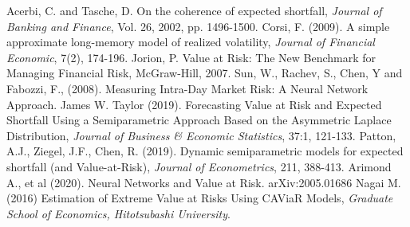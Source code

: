 \documentclass[a4paper,11pt,oneside]{book}
\begin{document}
	
	
	






	

	






Acerbi, C. and Tasche, D. On the coherence of expected shortfall, \textit{Journal of Banking and Finance}, Vol. 26, 2002,
pp. 1496-1500.\newline\newline
Corsi, F. (2009). A simple approximate long-memory model of realized volatility, \textit{Journal of
Financial Economic}, 7(2), 174-196.\newline\newline 
Jorion, P. Value at Risk: The New Benchmark for Managing Financial Risk, McGraw-Hill, 2007.\newline\newline
Sun, W., Rachev, S., Chen, Y and Fabozzi, F., (2008). Measuring Intra-Day Market
Risk: A Neural Network Approach.\newline\newline
James W. Taylor (2019). Forecasting Value at Risk and Expected Shortfall
Using a Semiparametric Approach Based on the Asymmetric Laplace Distribution, \textit{Journal of
Business \& Economic Statistics}, 37:1, 121-133.\newline\newline
Patton, A.J., Ziegel, J.F., Chen, R. (2019). Dynamic semiparametric models for expected shortfall
(and Value-at-Risk), \textit{Journal of Econometrics}, 211, 388-413.\newline\newline
Arimond A., et al (2020). Neural Networks and Value at Risk. 	arXiv:2005.01686\newline\newline
Nagai M. (2016) Estimation of Extreme Value at Risks Using CAViaR Models, \textit{Graduate School of Economics, Hitotsubashi University}.\newline\newline
\end{document}
